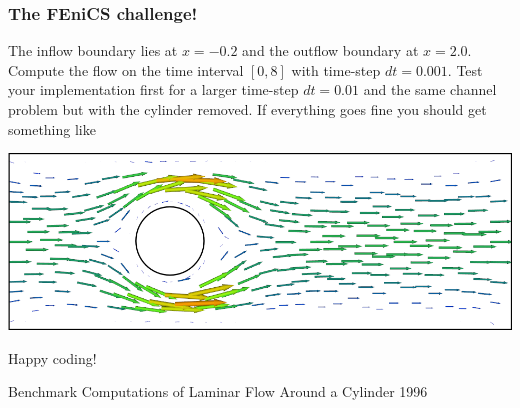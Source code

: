 \begin{frame}
    \frametitle{The FEniCS challenge!}
    The inflow boundary lies at $x = -0.2$ and the outflow boundary at
    $x=2.0$.
    Compute the flow on the time interval $[0,8]$ with time-step $dt =
    0.001$. Test your implementation first for a larger time-step $dt =
    0.01$ and the same channel problem but with the cylinder removed.
    If everything goes fine you should get something like
    \begin{center}
        \includegraphics[width=1.0\textwidth]{png/flow_around_cylinder.png}
    \end{center}
    \begin{center}
        {\large Happy coding}!
    \end{center}
              {Benchmark Computations of Laminar Flow Around a
              Cylinder}
              {1996}
\end{frame}
